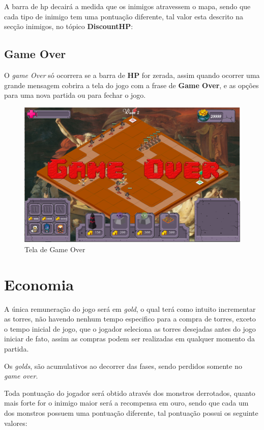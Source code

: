 \documentclass[11pt]{article} %
\begin{document}
A barra de hp decairá a medida que os inimigos atravessem o mapa, sendo que cada tipo de inimigo tem uma pontuação diferente, tal valor esta descrito na secção inimigos, no tópico \textbf{DiscountHP}:

\subsection{Game Over}
O \textit{game Over} só ocorrera se a barra de \textbf{HP} for zerada, assim quando ocorrer uma grande mensagem cobrira a tela do jogo com a frase de \textbf{Game Over}, e as opções para uma nova partida ou para fechar o jogo.

\begin{figure}[!htp]
\centering
\includegraphics[scale=0.3]{res/game_over.png}
\caption{Tela de Game Over}
\label{Game Over}
\end{figure}
\newpage

\section{Economia}

A única remuneração do jogo será em \textit{gold}, o qual terá como intuito incrementar as torres, não havendo nenhum tempo especifico para a compra de torres, exceto o tempo inicial de jogo, que o jogador seleciona as torres desejadas antes do jogo iniciar de fato, assim as compras podem ser realizadas em qualquer momento da partida.

Os \textit{golds}, são acumulativos ao decorrer das fases, sendo perdidos somente no \textit{game over}.

Toda pontuação do jogador será obtido através dos monstros derrotados, quanto mais forte for o inimigo  maior será a recompensa em ouro, sendo que cada um dos monstros possuem uma pontuação diferente, tal pontuação possui os seguinte valores:
\end{document}

